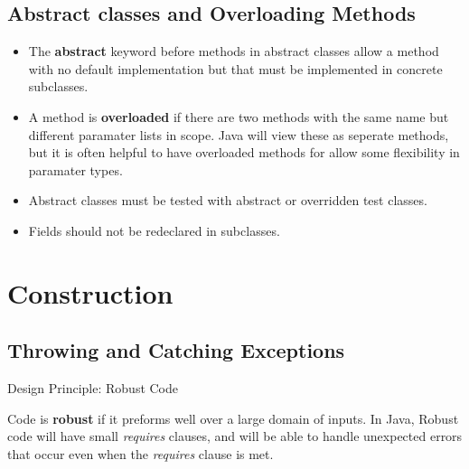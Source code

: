 \documentclass[letterpaper] {article}
\begin{document}
    \subsection{Abstract classes and Overloading Methods}
    \begin{itemize}
        \item The \textbf{abstract} keyword before methods in abstract classes allow a method with no default implementation but that must be implemented in concrete subclasses. 
        \item A method is \textbf{overloaded} if there are two methods with the same name but different paramater lists in scope. Java will view these as seperate methods, but it is often helpful to have overloaded methods for allow some flexibility in paramater types. 
        \item Abstract classes must be tested with abstract or overridden test classes. 
        \item Fields should not be redeclared in subclasses. 
    \end{itemize}


    \newpage
    \section{Construction} 

    \subsection{Throwing and Catching Exceptions}
    \begin{framed}
        \begin{center}
            Design Principle: Robust Code
        \end{center}
        Code is \textbf{robust} if it preforms well over a large domain of inputs. In Java, Robust code will have small \textit{requires} clauses, and will be able to handle unexpected errors that occur even when the \textit{requires} clause is met. 
    \end{framed}
\end{document}
